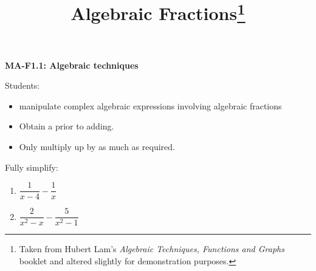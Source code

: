 \documentclass[11pt,a4paper,twoside]{article}
\title{Algebraic Fractions\thanks{Taken from Hubert Lam's \textit{Algebraic Techniques, Functions and Graphs} booklet and altered slightly for demonstration purposes.}}
\author{}
\date{}
\begin{document}
  
\ShowClozetrue

\maketitle

\begin{outcome}
  \textbf{MA-F1.1: Algebraic techniques}\par
  Students:
  \begin{itemize}
    \item manipulate complex algebraic expressions involving algebraic fractions
  \end{itemize}
\end{outcome}

\begin{important}
  \vspace{-\baselineskip}
  \begin{itemize}
    \item   Obtain a   prior to adding.
    \item   Only multiply up by as much as required.
  \end{itemize}
\end{important}

\GridOn
\begin{example}[height=8cm]{}
  Fully simplify:
\begin{multicols}{2}
\begin{enumerate}[label=(\alph*)]
\item   $\dfrac{1}{x - 4} - \dfrac{1}{x}$
\item   $\dfrac{2}{x^2 - x} - \dfrac{5}{x^2 - 1}$
\end{enumerate}
\end{multicols}
\end{example}

\newpage
\end{document}
